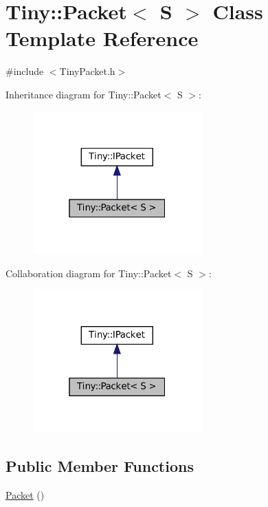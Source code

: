 \hypertarget{classTiny_1_1Packet}{}\section{Tiny\+:\+:Packet$<$ S $>$ Class Template Reference}
\label{classTiny_1_1Packet}


{\ttfamily \#include $<$Tiny\+Packet.\+h$>$}



Inheritance diagram for Tiny\+:\+:Packet$<$ S $>$\+:\nopagebreak
\begin{figure}[H]
\begin{center}
\leavevmode
\includegraphics[width=184pt]{classTiny_1_1Packet__inherit__graph}
\end{center}
\end{figure}


Collaboration diagram for Tiny\+:\+:Packet$<$ S $>$\+:\nopagebreak
\begin{figure}[H]
\begin{center}
\leavevmode
\includegraphics[width=184pt]{classTiny_1_1Packet__coll__graph}
\end{center}
\end{figure}
\subsection*{Public Member Functions}
\begin{DoxyCompactItemize}
\item 
\hyperlink{classTiny_1_1Packet_a81a8b302018e7091616e5c853b005201}{Packet} ()
\end{DoxyCompactItemize}


